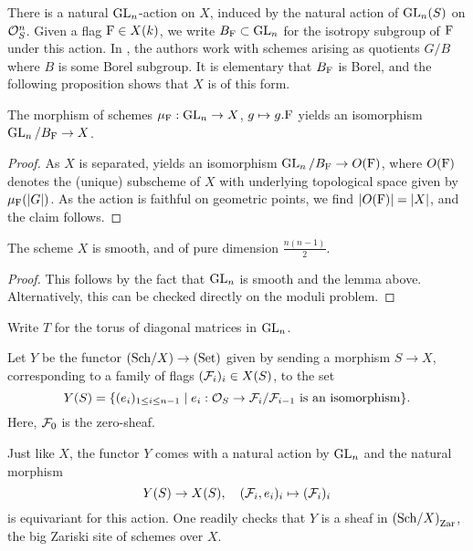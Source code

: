 \documentclass[../main.tex]{subfiles}
\begin{document}
There is a natural $\operatorname{GL}_n$-action on $X$, induced by the natural action of 
$\operatorname{GL}_n(S)$ on $\mathcal{O}_S^n$. Given a flag $\mathrm{F} \in X(k)$, we
write $B_{\mathrm{F}} \subset \operatorname{GL}_n$ for the isotropy subgroup of $\mathrm{F}$ under this
action. In \cite{delignelusztig1976}, the authors work with schemes
arising as quotients $G/B$ where $B$ is some Borel subgroup. 
It is elementary that $B_{\mathrm{F}}$ is Borel, 
and the following proposition shows that $X$ is of this form.

\begin{lem}\label{lem:FlagVarietyAsQuotient}
  The morphism of schemes $\mu_{\mathrm{F}}: \operatorname{GL}_n \to X$, $g \mapsto g.\mathrm{F}$
  yields an isomorphism $\operatorname{GL}_n/B_{\mathrm{F}} \to X$. 
\begin{proof}
  As $X$ is separated, \cite[Proposition 7.13]{milne2017algebraic} yields an 
  isomorphism $\operatorname{GL}_n/B_{\mathrm{F}} \to O(\mathrm{F})$, where $O(\mathrm{F})$
  denotes the (unique) subscheme of $X$ with underlying topological space given by
  $\mu_{\mathrm{F}}(\lvert G \rvert)$. As the action is faithful on geometric points, 
  we find $\lvert O(\mathrm{F}) \rvert = \lvert X \rvert$, and the claim follows.
\end{proof}
\end{lem}

\begin{prop}\label{prop:FlagVarIsSmooth}
  The scheme $X$ is smooth, and of pure dimension $\tfrac{n(n-1)}2$. 
\begin{proof}
  This follows by the fact that $\operatorname{GL}_n$ is smooth and the lemma above. 
  Alternatively, this can be checked directly on the moduli problem.
\end{proof}
\end{prop}

Write $T$ for the torus of diagonal matrices in $\operatorname{GL}_n$. 

\begin{defi}\label{def:MarkedFlagVar}
  Let $Y$ be the functor ${(\mathrm{Sch}/{X})} \to {(\mathrm{Set})}$ given by sending a morphism
  $S \to X$, corresponding to a family of flags $(\mathcal{F}_i)_i \in X(S)$, to the set
  \begin{equation*}
    Y(S) = \{(e_i)_{1 \leq i \leq n-1} \mid e_i: \mathcal{O}_S \to \mathcal{F}_i/\mathcal{F}_{i-1}
    \text{ is an isomorphism}\}.
  \end{equation*}
  Here, $\mathcal{F}_0$ is the zero-sheaf.
\end{defi}
Just like $X$, the functor $Y$ comes with a natural action by $\operatorname{GL}_n$
and the natural morphism
\begin{equation}\label{eq:naturalmapYtoX}
  Y(S) \to X(S), \quad (\mathcal{F}_i, e_i)_i \mapsto (\mathcal{F}_i)_i
\end{equation}
is equivariant for this action. One readily checks that $Y$ is a sheaf in
${(\mathrm{Sch}/{X})}_{\mathrm{Zar}}$, the big Zariski site of schemes over $X$.
\end{document}
